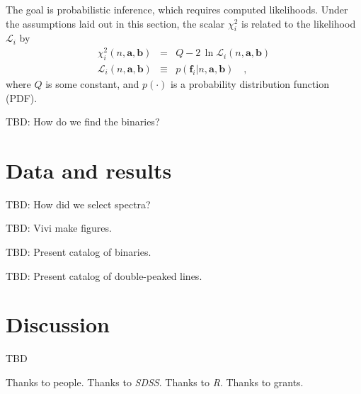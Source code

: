 \documentclass[preprint]{aastex}
\newcommand{\project}[1]{\textsl{#1}}
\newcommand{\SDSS}{\project{SDSS}}
\newcommand{\mmatrix}[1]{\boldsymbol{#1}}
\newcommand{\avec}{\mmatrix{a}}
\newcommand{\bvec}{\mmatrix{b}}
\newcommand{\fvec}{\mmatrix{f}}
\newcommand{\like}{\mathscr{L}}
\begin{document}
The goal is probabilistic inference, which requires computed
likelihoods.  Under the assumptions laid out in this section, the
scalar $\chi^2_i$ is related to the likelihood $\like_i$ by
\begin{eqnarray}\displaystyle
\chi^2_i(n,\avec,\bvec) &=& Q - 2\,\ln\like_i(n,\avec,\bvec) \nonumber\\
\like_i(n,\avec,\bvec) &\equiv& p(\fvec_i|n,\avec,\bvec)
\quad ,
\end{eqnarray}
where $Q$ is some constant, and $p(\cdot)$ is a probability
distribution function (PDF).

TBD:  How do we find the binaries?

\section{Data and results}

TBD:  How did we select spectra?

TBD:  Vivi make figures.

TBD:  Present catalog of binaries.

TBD:  Present catalog of double-peaked lines.

\section{Discussion}

TBD

\acknowledgements Thanks to people.  Thanks to \SDSS.  Thanks to
\project{R}.  Thanks to grants.
\end{document}
